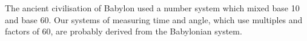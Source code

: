 The ancient civilisation of Babylon used a number system
which mixed base 10 and base 60. Our systems of measuring time
and angle, which use multiples and factors of 60, are
probably derived from the Babylonian system.